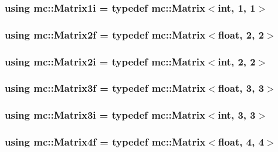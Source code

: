 \subsubsection[{\texorpdfstring{Matrix1i}{Matrix1i}}]{\setlength{\rightskip}{0pt plus 5cm}using {\bf mc\+::\+Matrix1i} = typedef {\bf mc\+::\+Matrix}$<${\bf int}, 1, 1$>$}\hypertarget{namespacemc_abd3b65ef804598d2bcb93051d7fbcc9e}{}\label{namespacemc_abd3b65ef804598d2bcb93051d7fbcc9e}
\subsubsection[{\texorpdfstring{Matrix2f}{Matrix2f}}]{\setlength{\rightskip}{0pt plus 5cm}using {\bf mc\+::\+Matrix2f} = typedef {\bf mc\+::\+Matrix}$<$float, 2, 2$>$}\hypertarget{namespacemc_a7f5fd82341ebac4add0554139e58ec61}{}\label{namespacemc_a7f5fd82341ebac4add0554139e58ec61}
\subsubsection[{\texorpdfstring{Matrix2i}{Matrix2i}}]{\setlength{\rightskip}{0pt plus 5cm}using {\bf mc\+::\+Matrix2i} = typedef {\bf mc\+::\+Matrix}$<${\bf int}, 2, 2$>$}\hypertarget{namespacemc_a3d6ef8ef71b722b552a14b3859cca75f}{}\label{namespacemc_a3d6ef8ef71b722b552a14b3859cca75f}
\subsubsection[{\texorpdfstring{Matrix3f}{Matrix3f}}]{\setlength{\rightskip}{0pt plus 5cm}using {\bf mc\+::\+Matrix3f} = typedef {\bf mc\+::\+Matrix}$<$float, 3, 3$>$}\hypertarget{namespacemc_a142a9fb1b5ed3503c520caca5924389e}{}\label{namespacemc_a142a9fb1b5ed3503c520caca5924389e}
\subsubsection[{\texorpdfstring{Matrix3i}{Matrix3i}}]{\setlength{\rightskip}{0pt plus 5cm}using {\bf mc\+::\+Matrix3i} = typedef {\bf mc\+::\+Matrix}$<${\bf int}, 3, 3$>$}\hypertarget{namespacemc_af5dbdaac2f76c49ea96bafaf8743298e}{}\label{namespacemc_af5dbdaac2f76c49ea96bafaf8743298e}
\subsubsection[{\texorpdfstring{Matrix4f}{Matrix4f}}]{\setlength{\rightskip}{0pt plus 5cm}using {\bf mc\+::\+Matrix4f} = typedef {\bf mc\+::\+Matrix}$<$float, 4, 4$>$}\hypertarget{namespacemc_afd32b9ea49ccd962bb337dc71450595b}{}\label{namespacemc_afd32b9ea49ccd962bb337dc71450595b}
